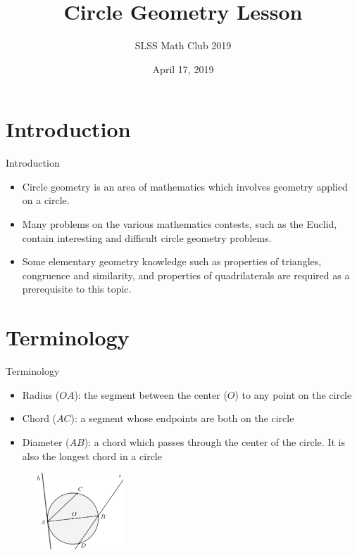 \documentclass{beamer}
\title{Circle Geometry Lesson}
\author{SLSS Math Club 2019}
\date{April 17, 2019}
\begin{document}
\frame{\titlepage}

\section{Introduction}
	\begin{frame}{Introduction}
	\begin{itemize}
	    \item Circle geometry is an area of mathematics which involves geometry applied on a circle.
	    \item Many problems on the various mathematics contests, such as the Euclid, contain interesting and difficult circle geometry problems. 
	    \item Some elementary geometry knowledge such as properties of triangles, congruence and similarity, and properties of quadrilaterals are required as a prerequisite to this
topic.
\end{itemize}
\end{frame}
	
\section{Terminology}
\begin{frame}{Terminology}
\begin{itemize}
		\item Radius ($OA$): the segment between the center ($O$) to any point on the circle
    	\item Chord ($AC$): a segment whose endpoints are both on the circle
    	\item Diameter ($AB$): a chord which passes through the center of the circle. It is also the longest chord in a circle 
\end{itemize}
	\begin{figure}[h!]
		\centering
		\includegraphics[width=0.3\textwidth]{Graphics/Week_13/GeometryDiagram.png}
		\label{fig: 2.1}
	\end{figure}
\end{frame}
\end{document}
